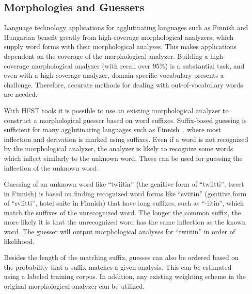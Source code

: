 \documentclass{llncs}
\begin{document}

\subsection{Morphologies and Guessers}
\label{sec: morph-guessers}

Language technology applications for agglutinating languages such as
Finnish and Hungarian benefit greatly from high-coverage morphological
analyzers, which supply word forms with their morphological
analyses. This makes applications dependent on the coverage of the
morphological analyzer. Building a high-coverage morphological
analyzer (with recall over 95\%) is a substantial task, and even with a
high-coverage analyzer, domain-specific vocabulary presents a
challenge. Therefore, accurate methods for dealing with
out-of-vocabulary words are needed.

With HFST tools it is possible to use an existing morphological
analyzer to construct a morphological guesser based on word
suffixes. Suffix-based guessing is sufficient for many agglutinating
languages such as Finnish~\cite{linden/2009/nodalida}, where most
inflection and derivation is marked using suffixes. Even if a word is
not recognized by the morphological analyzer, the analyzer is likely
to recognize some words which inflect similarly to the unknown
word. These can be used for guessing the inflection of the unknown
word.

Guessing of an unknown word like ``twiitin'' (the genitive form of
``twiitti'', tweet in Finnish) is based on finding recognized word
forms like ``sviitin'' (genitive form of ``sviitti'', hotel suite in
Finnish) that have long suffixes, such as ``-iitin'', which match the
suffixes of the unrecognized word. The longer the common suffix, the
more likely it is that the unrecognized word has the same inflection as
the known word. The guesser will output morphological analyses for
``twiitin'' in order of likelihood.

Besides the length of the matching suffix, guesses can also be ordered
based on the probability that a suffix matches a given analysis. This
can be estimated using a labeled training corpus. In addition, any
existing weighting scheme in the original morphological analyzer can
be utilized.
\end{document}
